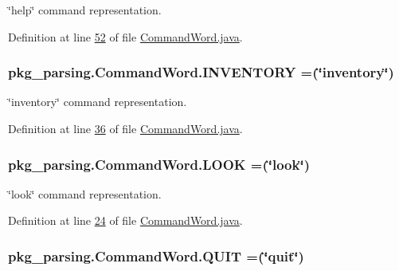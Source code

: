 \char`\"{}help\char`\"{} command representation. 



Definition at line \hyperlink{CommandWord_8java_source_l00052}{52} of file \hyperlink{CommandWord_8java_source}{Command\-Word.\-java}.

\hypertarget{enumpkg__parsing_1_1CommandWord_a3dace936c35682fe74dad6714af270e4}{
\subsubsection[{I\-N\-V\-E\-N\-T\-O\-R\-Y}]{\setlength{\rightskip}{0pt plus 5cm}pkg\-\_\-parsing.\-Command\-Word.\-I\-N\-V\-E\-N\-T\-O\-R\-Y =(\char`\"{}inventory\char`\"{})}}\label{enumpkg__parsing_1_1CommandWord_a3dace936c35682fe74dad6714af270e4}


\char`\"{}inventory\char`\"{} command representation. 



Definition at line \hyperlink{CommandWord_8java_source_l00036}{36} of file \hyperlink{CommandWord_8java_source}{Command\-Word.\-java}.

\hypertarget{enumpkg__parsing_1_1CommandWord_a56f571b76d6ef6d6c64f9b2081b53e86}{
\subsubsection[{L\-O\-O\-K}]{\setlength{\rightskip}{0pt plus 5cm}pkg\-\_\-parsing.\-Command\-Word.\-L\-O\-O\-K =(\char`\"{}look\char`\"{})}}\label{enumpkg__parsing_1_1CommandWord_a56f571b76d6ef6d6c64f9b2081b53e86}


\char`\"{}look\char`\"{} command representation. 



Definition at line \hyperlink{CommandWord_8java_source_l00024}{24} of file \hyperlink{CommandWord_8java_source}{Command\-Word.\-java}.

\hypertarget{enumpkg__parsing_1_1CommandWord_a2f645cd1791d5576f42e1fe14d202c17}{
\subsubsection[{Q\-U\-I\-T}]{\setlength{\rightskip}{0pt plus 5cm}pkg\-\_\-parsing.\-Command\-Word.\-Q\-U\-I\-T =(\char`\"{}quit\char`\"{})}}\label{enumpkg__parsing_1_1CommandWord_a2f645cd1791d5576f42e1fe14d202c17}


